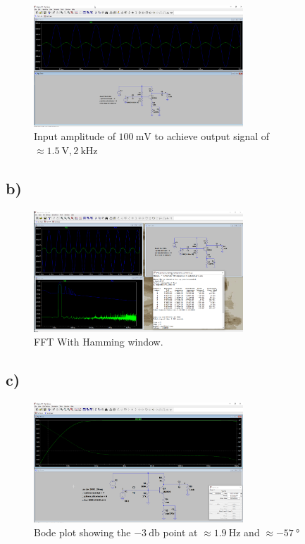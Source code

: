 \documentclass{article}
\begin{document}
	\begin{figure}[H]
	    \centering
	    \includegraphics[width=0.7\textwidth]{2a}
	    \caption{Input amplitude of $\SI{100}{\milli\volt}$ to achieve output signal of $\approx \SI{1.5}{\volt}, \SI{2}{\kilo\hertz}$}
	\end{figure}
	
	\subsection*{b)}
	
	\begin{figure}[H]
	    \centering
	    \includegraphics[width=0.7\textwidth]{2b}
	    \caption{FFT With Hamming window.}
	\end{figure}
	
	\subsection*{c)}

	\begin{figure}[H]
	    \centering
	    \includegraphics[width=0.7\textwidth]{2c}
	    \caption{Bode plot showing the $\SI{-3}{\decibel}$ point at $\approx \SI{1.9}{\hertz}$ and $\approx \SI{-57}{\degree}$}
	\end{figure}
\end{document}

